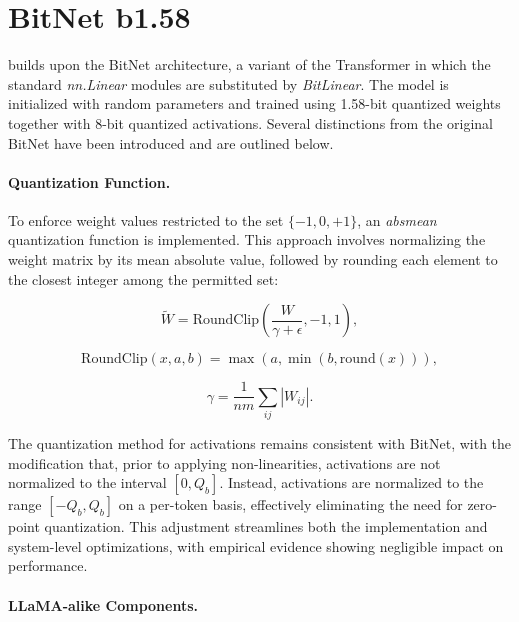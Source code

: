 \section{BitNet b1.58}

 builds upon the BitNet architecture, a variant of the Transformer in which the standard \emph{nn.Linear} modules are substituted by \emph{BitLinear}. The model is initialized with random parameters and trained using 1.58-bit quantized weights together with 8-bit quantized activations. Several distinctions from the original BitNet have been introduced and are outlined below.

\paragraph{Quantization Function.} To enforce weight values restricted to the set $\{-1, 0, +1\}$, an \emph{absmean} quantization function is implemented. This approach involves normalizing the weight matrix by its mean absolute value, followed by rounding each element to the closest integer among the permitted set:

\begin{equation}
    \widetilde{W} = \mathrm{RoundClip}(\frac{W}{\gamma + \epsilon}, -1, 1),
\end{equation}

\begin{equation}
    \mathrm{RoundClip}(x, a, b) = \max(a, \min(b, \mathrm{round}(x))),
\end{equation}

\begin{equation}
    \gamma = \frac{1}{nm}\sum_{ij} |W_{ij}|.
\end{equation}

The quantization method for activations remains consistent with BitNet, with the modification that, prior to applying non-linearities, activations are not normalized to the interval $[0, Q_b]$. Instead, activations are normalized to the range $[-Q_b, Q_b]$ on a per-token basis, effectively eliminating the need for zero-point quantization. This adjustment streamlines both the implementation and system-level optimizations, with empirical evidence showing negligible impact on performance.

\paragraph{LLaMA-alike Components.}

